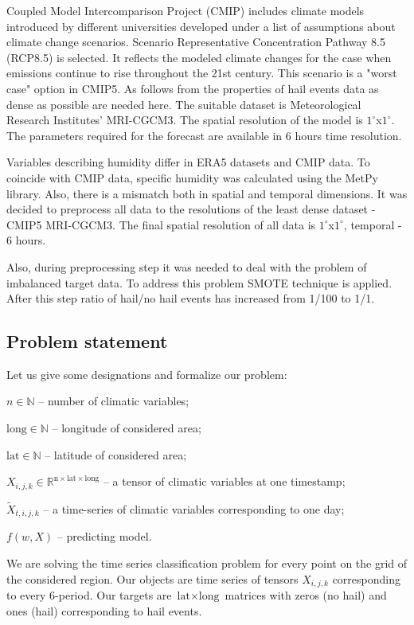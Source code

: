 \documentclass[conference]{IEEEtran}
\begin{document}

Coupled Model Intercomparison Project (CMIP) includes climate models introduced by different universities developed under a list of assumptions about climate change scenarios. Scenario Representative Concentration Pathway 8.5 (RCP8.5) is selected. It reflects the modeled climate changes for the case when emissions continue to rise throughout the 21st century. This scenario is a "worst case" option in CMIP5. As follows from the properties of hail events data as dense as possible are needed here.  The suitable dataset is Meteorological Research Institutes' MRI-CGCM3. The spatial resolution of the model is $1^{\circ}$x$1^{\circ}$. The parameters required for the forecast are available in 6 hours time resolution. 


Variables describing humidity differ in ERA5 datasets and CMIP data. To coincide with CMIP data, specific humidity was calculated using the MetPy library. Also, there is a mismatch both in spatial and temporal dimensions. It was decided to preprocess all data to the resolutions of the least dense dataset - CMIP5 MRI-CGCM3. The final spatial resolution of all data is $1^{\circ}$x$1^{\circ}$, temporal - 6 hours. 

Also, during preprocessing step it was needed to deal with the problem of imbalanced target data. To address this problem SMOTE technique \cite{chawla2002smote} is applied. After this step ratio of hail/no hail events has increased from 1/100 to 1/1.
\subsection{Problem statement}
Let us give some designations and formalize our problem:

$n \in \mathbb{N}$ -- number of climatic variables;

$\text{long} \in \mathbb{N}$ -- longitude of considered area;

$\text{lat} \in \mathbb{N}$ -- latitude of considered area;

$X_{i,j,k} \in \mathbb{R}^{\text{n}\times \text{lat} \times \text{long}} $ -- a tensor of climatic variables at one timestamp;

$\widetilde{X}_{t, i, j, k}$ -- a time-series of climatic variables corresponding to one day;

$f(w, X)$ -- predicting model.

We are solving the time series classification problem for every point on the grid of the considered region. Our objects are time series of tensors $X_{i,j,k}$ corresponding to every 6-period. Our targets are $\text{lat} \times \text{long} $ matrices with zeros (no hail) and ones (hail) corresponding to hail events. 
\end{document}
